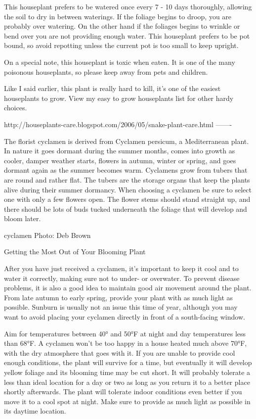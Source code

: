 \documentclass{book}
\begin{document}
This houseplant prefers to be watered once every 7 - 10 days thoroughly, allowing the soil to dry in between waterings. If the foliage begins to droop, you are probably over watering. On the other hand if the foliages begins to wrinkle or bend over you are not providing enough water. This houseplant prefers to be pot bound, so avoid repotting unless the current pot is too small to keep upright.


On a special note, this houseplant is toxic when eaten. It is one of the many poisonous houseplants, so please keep away from pets and children.


Like I said earlier, this plant is really hard to kill, it's one of the easiest houseplants to grow. View my easy to grow houseplants list for other hardy choices.


http://houseplants-care.blogspot.com/2006/05/snake-plant-care.html
-------


The florist cyclamen is derived from Cyclamen persicum, a Mediterranean plant. In nature it goes dormant during the summer months, comes into growth as cooler, damper weather starts, flowers in autumn, winter or spring, and goes dormant again as the summer becomes warm. Cyclamens grow from tubers that are round and rather flat. The tubers are the storage organs that keep the plants alive during their summer dormancy.
When choosing a cyclamen be sure to select one with only a few flowers open. The flower stems should stand straight up, and there should be lots of buds tucked underneath the foliage that will develop and bloom later.

cyclamen
Photo: Deb Brown

Getting the Most Out of Your Blooming Plant

After you have just received a cyclamen, it's important to keep it cool and to water it correctly, making sure not to under- or overwater. To prevent disease problems, it is also a good idea to maintain good air movement around the plant.
From late autumn to early spring, provide your plant with as much light as possible. Sunburn is usually not an issue this time of year, although you may want to avoid placing your cyclamen directly in front of a south-facing window.

Aim for temperatures between 40° and 50°F at night and day temperatures less than 68°F. A cyclamen won't be too happy in a house heated much above 70°F, with the dry atmosphere that goes with it. If you are unable to provide cool enough conditions, the plant will survive for a time, but eventually it will develop yellow foliage and its blooming time may be cut short. It will probably tolerate a less than ideal location for a day or two as long as you return it to a better place shortly afterwards. The plant will tolerate indoor conditions even better if you move it to a cool spot at night. Make sure to provide as much light as possible in its daytime location.
\end{document}
